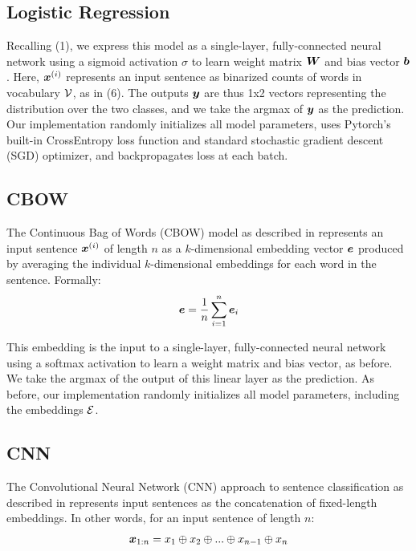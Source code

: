 \documentclass[11pt]{article}
\begin{document}
\subsection{Logistic Regression}

Recalling (1), we express this model as a single-layer, fully-connected neural network using a sigmoid activation $\sigma$ to learn weight matrix $\boldsymbol{W}$ and bias vector $\boldsymbol{b}$. Here, $\boldsymbol{x}^{(i)}$ represents an input sentence as binarized counts of words in vocabulary $\mathcal{V}$, as in (6). The outputs $\boldsymbol{y}$ are thus 1x2 vectors representing the distribution over the two classes, and we take the argmax of $\boldsymbol{y}$ as the prediction. Our implementation randomly initializes all model parameters, uses Pytorch's built-in CrossEntropy loss function and standard stochastic gradient descent (SGD) optimizer, and backpropagates loss at each batch.

\subsection{CBOW}

The Continuous Bag of Words (CBOW) model as described in \citep{mikolov2013efficient} represents an input sentence $\boldsymbol{x}^{(i)}$ of length $n$ as a $k$-dimensional embedding vector $\boldsymbol{e}$ produced by averaging the individual $k$-dimensional embeddings for each word in the sentence. Formally:
\begin{align}
  \boldsymbol{e} = \frac{1}{n} \sum_{i=1}^{n} \boldsymbol{e}_i
\end{align}

This embedding is the input to a single-layer, fully-connected neural network using a softmax activation to learn a weight matrix and bias vector, as before. We take the argmax of the output of this linear layer as the prediction. As before, our implementation randomly initializes all model parameters, including the embeddings $\mathcal{E}$.


\subsection{CNN}

The Convolutional Neural Network (CNN) approach to sentence classification as described in \cite{kim2014convolutional} represents input sentences as the concatenation of fixed-length embeddings. In other words, for an input sentence of length $n$:
\begin{align}
  \boldsymbol{x}_{1:n} = x_1 \oplus x_2 \oplus ... \oplus x_{n-1} \oplus x_n
\end{align}
\end{document}

